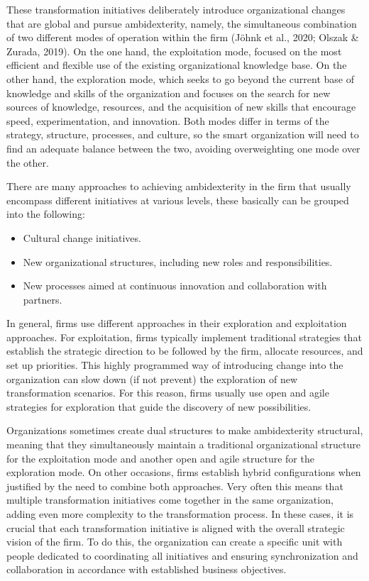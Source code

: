 \documentclass[
  letterpaper,
  DIV=11,
  numbers=noendperiod]{scrreprt}
\begin{document}
These transformation initiatives deliberately introduce organizational
changes that are global and pursue ambidexterity, namely, the
simultaneous combination of two different modes of operation within the
firm (Jöhnk et al., 2020; Olszak \& Zurada, 2019). On the one hand, the
exploitation mode, focused on the most efficient and flexible use of the
existing organizational knowledge base. On the other hand, the
exploration mode, which seeks to go beyond the current base of knowledge
and skills of the organization and focuses on the search for new sources
of knowledge, resources, and the acquisition of new skills that
encourage speed, experimentation, and innovation. Both modes differ in
terms of the strategy, structure, processes, and culture, so the smart
organization will need to find an adequate balance between the two,
avoiding overweighting one mode over the other.

There are many approaches to achieving ambidexterity in the firm that
usually encompass different initiatives at various levels, these
basically can be grouped into the following:

\begin{itemize}
\item
  Cultural change initiatives.
\item
  New organizational structures, including new roles and
  responsibilities.
\item
  New processes aimed at continuous innovation and collaboration with
  partners.
\end{itemize}

In general, firms use different approaches in their exploration and
exploitation approaches. For exploitation, firms typically implement
traditional strategies that establish the strategic direction to be
followed by the firm, allocate resources, and set up priorities. This
highly programmed way of introducing change into the organization can
slow down (if not prevent) the exploration of new transformation
scenarios. For this reason, firms usually use open and agile strategies
for exploration that guide the discovery of new possibilities.

Organizations sometimes create dual structures to make ambidexterity
structural, meaning that they simultaneously maintain a traditional
organizational structure for the exploitation mode and another open and
agile structure for the exploration mode. On other occasions, firms
establish hybrid configurations when justified by the need to combine
both approaches. Very often this means that multiple transformation
initiatives come together in the same organization, adding even more
complexity to the transformation process. In these cases, it is crucial
that each transformation initiative is aligned with the overall
strategic vision of the firm. To do this, the organization can create a
specific unit with people dedicated to coordinating all initiatives and
ensuring synchronization and collaboration in accordance with
established business objectives.
\end{document}
